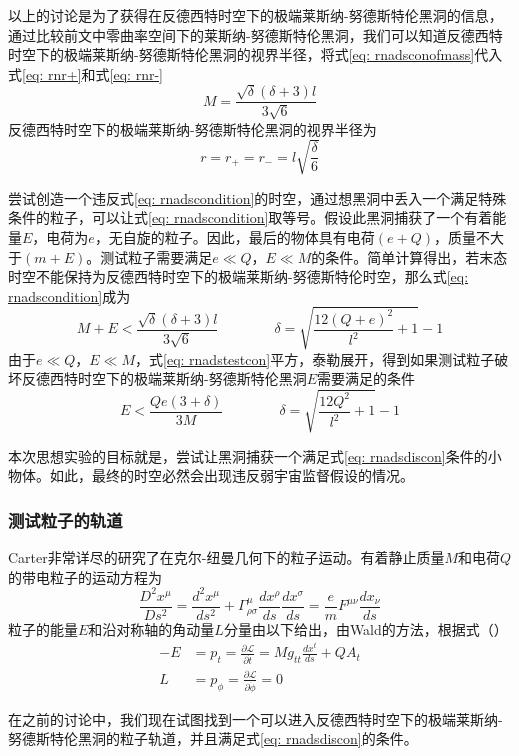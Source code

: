 以上的讨论是为了获得在反德西特时空下的极端莱斯纳-努德斯特伦黑洞的信息，通过比较前文中零曲率空间下的莱斯纳-努德斯特伦黑洞，我们可以知道反德西特时空下的极端莱斯纳-努德斯特伦黑洞的视界半径，将式\eqref{eq: rnadsconofmass}代入式\eqref{eq: rnr+}和式\eqref{eq: rnr-}
\begin{equation}\label{eq: rnadsconofmass}
    M=\frac{\sqrt{\delta } (\delta +3) l}{3 \sqrt{6}}
\end{equation}
反德西特时空下的极端莱斯纳-努德斯特伦黑洞的视界半径为
\begin{equation}\label{eq: rnadshorizonex}
    r=r_+=r_-=l\sqrt{\frac{\delta}{6}} 
\end{equation}

尝试创造一个违反式\eqref{eq: rnadscondition}的时空，通过想黑洞中丢入一个满足特殊条件的粒子，可以让式\eqref{eq: rnadscondition}取等号。假设此黑洞捕获了一个有着能量$E$，电荷为$e$，无自旋的粒子。因此，最后的物体具有电荷$\left(e+Q\right)$，质量不大于$\left(m+E\right)$。测试粒子需要满足$e\ll Q$，$E\ll M$的条件。简单计算得出，若末态时空不能保持为反德西特时空下的极端莱斯纳-努德斯特伦时空，那么式\eqref{eq: rnadscondition}成为
\begin{equation}\label{eq: rnadstestcon}
    M+E < \frac{\sqrt{\delta } (\delta +3) l}{3 \sqrt{6}} \quad\quad\quad\quad  \delta= \sqrt{\frac{12 \left(Q+e\right)^2}{l^2}+1}-1
\end{equation}
由于$e\ll Q$，$E\ll M$，式\eqref{eq: rnadstestcon}平方，泰勒展开，得到如果测试粒子破坏反德西特时空下的极端莱斯纳-努德斯特伦黑洞$E$需要满足的条件
\begin{equation}\label{eq: rnadsdiscon}
    E < \frac{Q e \left(3+\delta\right)}{3M} \qquad\qquad  \delta= \sqrt{\frac{12 Q^2}{l^2}+1}-1
\end{equation}

本次思想实验的目标就是，尝试让黑洞捕获一个满足式\eqref{eq: rnadsdiscon}条件的小物体。如此，最终的时空必然会出现违反弱宇宙监督假设的情况\citep{wald1974gedanken}。
\subsubsection{测试粒子的轨道}
Carter非常详尽的研究了在克尔-纽曼几何下的粒子运动\cite{carter1968global}。有着静止质量$M$和电荷$Q$的带电粒子的运动方程为
\begin{equation}
    \frac{D^2x^\mu}{D s^2}=\frac{d^2x^\mu}{ds^2}+\Gamma^{\mu}_{\rho\sigma }\frac{dx^\rho}{ds}\frac{dx^\sigma}{ds}=\frac{e}{m}F^{\mu\nu }\frac{dx_\nu}{ds}
\end{equation}
粒子的能量$E$和沿对称轴的角动量$L$分量由以下给出，由Wald的方法\cite{wald1974gedanken}，根据式（）
\begin{align}
    -E&=p_t=\frac{\partial \mathcal{L}}{\partial \dot{t}}=Mg_{tt}\frac{dx^t}{ds}+QA_t \\
    L&=p_\phi=\frac{\partial \mathcal{L}}{\partial \dot{\phi}}=0
\end{align}

在之前的讨论中，我们现在试图找到一个可以进入反德西特时空下的极端莱斯纳-努德斯特伦黑洞的粒子轨道，并且满足式\eqref{eq: rnadsdiscon}的条件。
